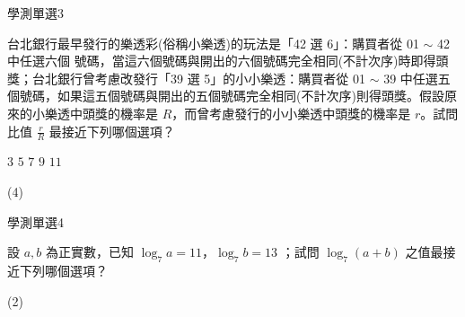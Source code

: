     \begin{QUESTION}
        \begin{ExamInfo}{94}{學測}{單選}{3}
        \end{ExamInfo}
        \begin{ExamAnsRateInfo}{52}{82}{54}{20}
        \end{ExamAnsRateInfo}
        \begin{QBODY}
            台北銀行最早發行的樂透彩(俗稱小樂透)的玩法是「42 選 6」：購買者從 01 $\sim$ 42 中任選六個 號碼，當這六個號碼與開出的六個號碼完全相同(不計次序)時即得頭獎；台北銀行曾考慮改發行「39 選 5」的小小樂透：購買者從 01 $\sim$ 39 中任選五個號碼，如果這五個號碼與開出的五個號碼完全相同(不計次序)則得頭獎。假設原來的小樂透中頭獎的機率是 $R$，而曾考慮發行的小小樂透中頭獎的機率是 $r$。試問比值 $\frac{r}{R}$ 最接近下列哪個選項？
			\begin{QOPS}
				\QOP $3$
				\QOP $5$
				\QOP $7$
				\QOP $9$
				\QOP $11$
			\end{QOPS}
        \end{QBODY}
        \begin{QFROMS}
        \end{QFROMS}
        \begin{QTAGS}\end{QTAGS}
        \begin{QANS}
            (4)
        \end{QANS}
        \begin{QSOLLIST}
        \end{QSOLLIST}
        \begin{QEMPTYSPACE}
        \end{QEMPTYSPACE}
    \end{QUESTION}
    \begin{QUESTION}
        \begin{ExamInfo}{94}{學測}{單選}{4}
        \end{ExamInfo}
        \begin{ExamAnsRateInfo}{32}{65}{21}{10}
        \end{ExamAnsRateInfo}
        \begin{QBODY}
            設 $a, b$ 為正實數，已知 $\log_7 a = 11$，$\log_7 b = 13$ ；試問 $\log_7 (a + b)$ 之值最接近下列哪個選項？ 
			\begin{QOPS} 
				\QOP 12 
				\QOP 13 
				\QOP 14 
				\QOP 23 
				\QOP 24
			\end{QOPS}
        \end{QBODY}
        \begin{QFROMS}
        \end{QFROMS}
        \begin{QTAGS}\end{QTAGS}
        \begin{QANS}
            (2)
        \end{QANS}
        \begin{QSOLLIST}
        \end{QSOLLIST}
        \begin{QEMPTYSPACE}
        \end{QEMPTYSPACE}
    \end{QUESTION}
